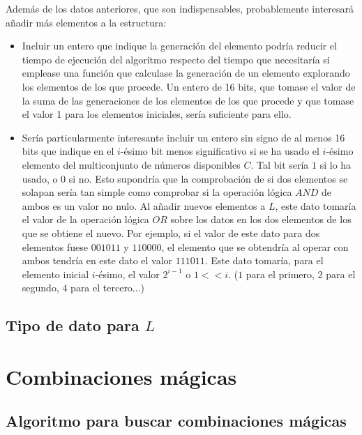 \documentclass{article}
\begin{document}
Además de los datos anteriores, que son indispensables, probablemente interesará añadir más elementos a la estructura:

\begin{itemize}
	\item Incluir un entero que indique la generación del elemento podría reducir el tiempo de ejecución del algoritmo respecto del tiempo que necesitaría si emplease una función que calculase la generación de un elemento explorando los elementos de los que procede. Un entero de 16 bits, que tomase el valor de la suma de las generaciones de los elementos de los que procede y que tomase el valor 1 para los elementos iniciales, sería suficiente para ello.
	\item Sería particularmente interesante incluir un entero sin signo de al menos 16 bits que indique en el $i$-ésimo bit menos significativo si se ha usado el $i$-ésimo elemento del multiconjunto de números disponibles $C$. Tal bit sería $1$ si lo ha usado, o $0$ si no. Esto supondría que la comprobación de si dos elementos se solapan sería tan simple como comprobar si la operación lógica $AND$ de ambos es un valor no nulo. Al añadir nuevos elementos a $L$, este dato tomaría el valor de la operación lógica $OR$ sobre los datos en los dos elementos de los que se obtiene el nuevo. Por ejemplo, si el valor de este dato para dos elementos fuese $001011$ y $110000$, el elemento que se obtendría al operar con ambos tendría en este dato el valor $111011$. Este dato tomaría, para el elemento inicial $i$-ésimo, el valor $2^{i-1}$ o $1 << i$. ($1$ para el primero, $2$ para el segundo, $4$ para el tercero...)
\end{itemize}

\subsection{Tipo de dato para $L$}

\section{Combinaciones mágicas}
\subsection{Algoritmo para buscar combinaciones mágicas}
\end{document}
